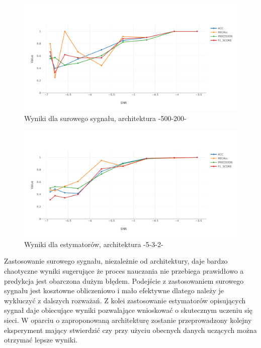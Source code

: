 \documentclass[12pt, a4paper, oneside]{article}
\begin{document}
	\begin{figure}[H]
		\centering
		\includegraphics[width=14cm]{images/nn_full_signal_500_200.pdf}
		\caption{Wyniki dla surowego sygnału, architektura -500-200-}
	\end{figure}

	\begin{figure}[H]
		\centering
		\includegraphics[width=14cm]{images/nn_small_532.pdf}
		\caption{Wyniki dla estymatorów, architektura -5-3-2-}
	\end{figure}

	Zastosowanie surowego sygnału, niezależnie od architektury, daje bardzo chaotyczne wyniki sugerujące że proces nauczania nie przebiega prawidłowo a predykcja jest obarczona dużym błędem. Podejście z zastosowaniem surowego sygnału jest kosztowne obliczeniowo i mało efektywne dlatego należy je wykluczyć z dalszych rozważań. Z kolei zastosowanie estymatorów opisujących sygnał daje obiecujące wyniki pozwalające wnioskować o skutecznym uczeniu się sieci. W oparciu o zaproponowaną architekturę zostanie przeprowadzony kolejny eksperyment mający stwierdzić czy przy użyciu obecnych danych uczących można otrzymać lepsze wyniki.
	
\end{document}

